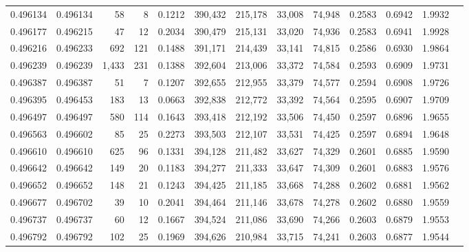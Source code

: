 \begin{tabular}{rrrrrrrrrrrrr}
0.496134 & 0.496134 &    58 &     8 &                                     0.1212 & 390,432 & 215,178 &  33,008 &  74,948 & 0.2583 & 0.6942 & 1.9932 \\
0.496177 & 0.496215 &    47 &    12 &                                     0.2034 & 390,479 & 215,131 &  33,020 &  74,936 & 0.2583 & 0.6941 & 1.9928 \\
0.496216 & 0.496233 &   692 &   121 &                                     0.1488 & 391,171 & 214,439 &  33,141 &  74,815 & 0.2586 & 0.6930 & 1.9864 \\
0.496239 & 0.496239 & 1,433 &   231 &                                     0.1388 & 392,604 & 213,006 &  33,372 &  74,584 & 0.2593 & 0.6909 & 1.9731 \\
0.496387 & 0.496387 &    51 &     7 &                                     0.1207 & 392,655 & 212,955 &  33,379 &  74,577 & 0.2594 & 0.6908 & 1.9726 \\
0.496395 & 0.496453 &   183 &    13 &                                     0.0663 & 392,838 & 212,772 &  33,392 &  74,564 & 0.2595 & 0.6907 & 1.9709 \\
0.496497 & 0.496497 &   580 &   114 &                                     0.1643 & 393,418 & 212,192 &  33,506 &  74,450 & 0.2597 & 0.6896 & 1.9655 \\
0.496563 & 0.496602 &    85 &    25 &                                     0.2273 & 393,503 & 212,107 &  33,531 &  74,425 & 0.2597 & 0.6894 & 1.9648 \\
0.496610 & 0.496610 &   625 &    96 &                                     0.1331 & 394,128 & 211,482 &  33,627 &  74,329 & 0.2601 & 0.6885 & 1.9590 \\
0.496642 & 0.496642 &   149 &    20 &                                     0.1183 & 394,277 & 211,333 &  33,647 &  74,309 & 0.2601 & 0.6883 & 1.9576 \\
0.496652 & 0.496652 &   148 &    21 &                                     0.1243 & 394,425 & 211,185 &  33,668 &  74,288 & 0.2602 & 0.6881 & 1.9562 \\
0.496677 & 0.496702 &    39 &    10 &                                     0.2041 & 394,464 & 211,146 &  33,678 &  74,278 & 0.2602 & 0.6880 & 1.9559 \\
0.496737 & 0.496737 &    60 &    12 &                                     0.1667 & 394,524 & 211,086 &  33,690 &  74,266 & 0.2603 & 0.6879 & 1.9553 \\
0.496792 & 0.496792 &   102 &    25 &                                     0.1969 & 394,626 & 210,984 &  33,715 &  74,241 & 0.2603 & 0.6877 & 1.9544 \\

\end{tabular}
